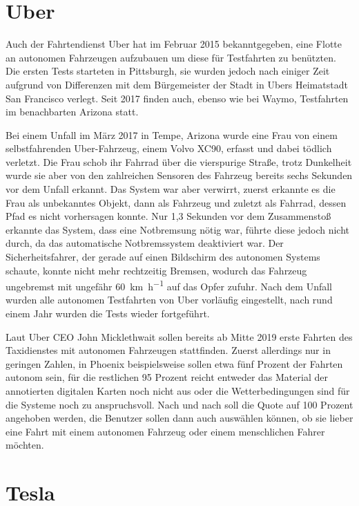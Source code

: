 \section{Uber}

Auch der Fahrtendienst Uber hat im Februar 2015 bekanntgegeben, eine Flotte an autonomen Fahrzeugen aufzubauen um diese für Testfahrten zu benützten. Die ersten Tests starteten in Pittsburgh, sie wurden jedoch nach einiger Zeit aufgrund von Differenzen mit dem Bürgemeister der Stadt in Ubers Heimatstadt San Francisco verlegt. Seit 2017 finden auch, ebenso wie bei Waymo, Testfahrten im benachbarten Arizona statt. 

Bei einem Unfall im März 2017 in Tempe, Arizona wurde eine Frau von einem selbstfahrenden Uber-Fahrzeug, einem Volvo XC90, erfasst und dabei tödlich verletzt. Die Frau schob ihr Fahrrad über die vierspurige Straße, trotz Dunkelheit wurde sie aber von den zahlreichen Sensoren des Fahrzeug bereits sechs Sekunden vor dem Unfall erkannt. Das System war aber verwirrt, zuerst erkannte es die Frau als unbekanntes Objekt, dann als Fahrzeug und zuletzt als Fahrrad, dessen Pfad es nicht vorhersagen konnte. Nur 1,3 Sekunden vor dem Zusammenstoß erkannte das System, dass eine Notbremsung nötig war, führte diese jedoch nicht durch, da das automatische Notbremssystem deaktiviert war. Der Sicherheitsfahrer, der gerade auf einen Bildschirm des autonomen Systems schaute, konnte nicht mehr rechtzeitig Bremsen, wodurch das Fahrzeug ungebremst mit ungefähr \SI[per-mode=symbol]{60}{\kilo\metre\per\hour} auf das Opfer zufuhr. Nach dem Unfall wurden alle autonomen Testfahrten von Uber vorläufig eingestellt, nach rund einem Jahr wurden die Tests wieder fortgeführt.

Laut Uber CEO John Micklethwait sollen bereits ab Mitte 2019 erste Fahrten des Taxidienstes mit autonomen Fahrzeugen stattfinden. Zuerst allerdings nur in geringen Zahlen, in Phoenix beispielsweise sollen etwa fünf Prozent der Fahrten autonom sein, für die restlichen 95 Prozent reicht entweder das Material der annotierten digitalen Karten noch nicht aus oder die Wetterbedingungen sind für die Systeme noch zu anspruchsvoll. Nach und nach soll die Quote auf 100 Prozent angehoben werden, die Benutzer sollen dann auch auswählen können, ob sie lieber eine Fahrt mit einem autonomen Fahrzeug oder einem menschlichen Fahrer möchten.

\section{Tesla}

